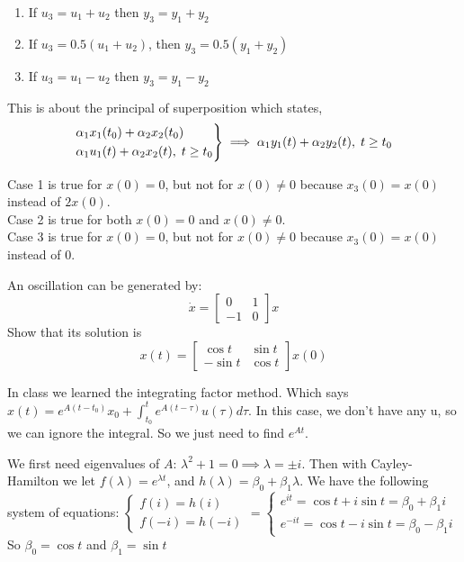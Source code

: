\documentclass[11pt]{article}
\begin{document}
\begin{enumerate}
    \item If $u_3 = u_1 + u_2$ then $y_3 = y_1 + y_2$
    \item If $u_3 = 0.5 (u_1 + u_2)$, then $y_3 = 0.5(y_1 + y_2)$
    \item If $u_3 = u_1 - u_2$ then $y_3 = y_1 - y_2$ 
\end{enumerate}


\soln

This is about the principal of superposition which states,
$$
\begin{rcases*}
    \alpha_1x_1(t_0) + \alpha_2x_2(t_0) \\
    \alpha_1u_1(t) + \alpha_2x_2(t), \; t \geq t_0
\end{rcases*} \implies \alpha_1y_1(t) + \alpha_2y_2(t), \; t \geq t_0
$$

Case 1 is true for $x(0) = 0$, but not for $x(0) \neq 0$ because $x_3(0) = x(0)$ instead of $2x(0)$.\\
Case 2 is true for both $x(0) = 0$ and $x(0) \neq 0$.\\
Case 3 is true for $x(0) = 0$, but not for $x(0) \neq 0$ because $x_3(0) = x(0)$ instead of $0$.\\


An oscillation can be generated by:
$$
\dot{x} = \begin{bmatrix}
    0 & 1\\-1 &0
\end{bmatrix}x
$$
Show that its solution is $$
x(t) = \begin{bmatrix}
    \cos t & \sin t \\ - \sin t & \cos t
\end{bmatrix}x(0)
$$

\soln

In class we learned the integrating factor method.
Which says $x(t) = e^{A(t - t_0)}x_0 + \int_{t_0}^t e^{A(t - \tau)} u(\tau) d\tau$.
In this case, we don't have any u, so we can ignore the integral.
So we just need to find $e^{At}$.

We first need eigenvalues of $A$:
$\lambda^2 + 1 = 0 \implies \lambda = \pm i$. 
Then with Cayley-Hamilton we let $f(\lambda) = e^{\lambda t}$,
and $h(\lambda) = \beta_0 + \beta_1 \lambda$.
We have the following system of equations:
$\begin{cases}
    f(i) = h(i)\\
    f(-i) = h(-i)
\end{cases} = \begin{cases}
    e^{it} = \cos t + i \sin t = \beta_0 + \beta_1 i\\
    e^{-it} = \cos t - i \sin t = \beta_0 - \beta_1 i
\end{cases}$
So $\beta_0 = \cos t$ and $\beta_1 = \sin t$
\end{document}
